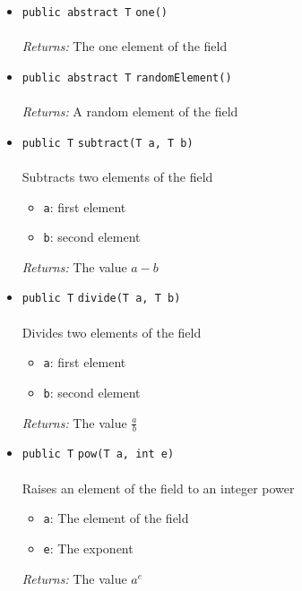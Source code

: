 \begin{itemize}
\item \lstinline|public abstract T| \lstinline|one|\lstinline|()|\\ \\[-0.6em]
\emph{Returns:} The one element of the field



\item \lstinline|public abstract T| \lstinline|randomElement|\lstinline|()|\\ \\[-0.6em]
\emph{Returns:} A random element of the field



\item \lstinline|public T| \lstinline|subtract|\lstinline|(T a, T b)|\\ \\[-0.6em]
Subtracts two elements of the field
\begin{itemize}
\item \lstinline|a|: first element
\item \lstinline|b|: second element
\end{itemize}

\emph{Returns:} The value $a - b$

\item \lstinline|public T| \lstinline|divide|\lstinline|(T a, T b)|\\ \\[-0.6em]
Divides two elements of the field
\begin{itemize}
\item \lstinline|a|: first element
\item \lstinline|b|: second element
\end{itemize}

\emph{Returns:} The value $\frac{a}{b}$

\item \lstinline|public T| \lstinline|pow|\lstinline|(T a, int e)|\\ \\[-0.6em]
Raises an element of the field to an integer power
\begin{itemize}
\item \lstinline|a|: The element of the field
\item \lstinline|e|: The exponent
\end{itemize}

\emph{Returns:} The value $a^e$

\end{itemize}

